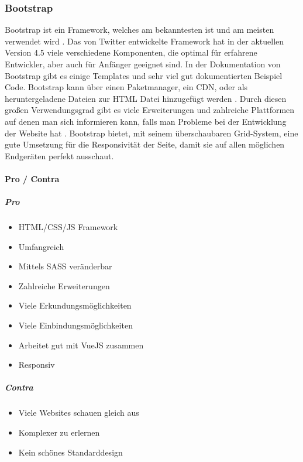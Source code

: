 		\subsubsection{Bootstrap}
		\label{chapter:study-frontend-frameworks-bootstrap}
		Bootstrap ist ein Framework, welches am bekanntesten ist und am meisten verwendet wird \cite{introduction-bootstrap, learning-bootstrap}. Das von Twitter entwickelte Framework hat in der aktuellen Version 4.5 viele verschiedene Komponenten, die optimal für erfahrene Entwickler, aber auch für Anfänger geeignet sind. In der Dokumentation von Bootstrap gibt es einige Templates und sehr viel gut dokumentierten Beispiel Code\cite{introduction-bootstrap}. Bootstrap kann über einen Paketmanager, ein CDN, oder als heruntergeladene Dateien zur HTML Datei hinzugefügt werden \cite{bootstrap-docu}. Durch diesen großen Verwendungsgrad gibt es viele Erweiterungen und zahlreiche Plattformen auf denen man sich informieren kann, falls man Probleme bei der Entwicklung der Website hat \cite{learning-bootstrap}. Bootstrap bietet, mit seinem überschaubaren Grid-System, eine gute Umsetzung für die Responsivität der Seite, damit sie auf allen möglichen Endgeräten perfekt ausschaut.
		\paragraph{Pro / Contra}
		\subparagraph{Pro}
		\begin{itemize}
			\item HTML/CSS/JS Framework
			\item Umfangreich
			\item Mittels SASS veränderbar
			\item Zahlreiche Erweiterungen
			\item Viele Erkundungsmöglichkeiten
			\item Viele Einbindungsmöglichkeiten
			\item Arbeitet gut mit VueJS zusammen
			\item Responsiv
		\end{itemize}
	\label{list:bootstrappro}
		\subparagraph{Contra}
		\begin{itemize}
			\item Viele Websites schauen gleich aus
			\item Komplexer zu erlernen
			\item Kein schönes Standarddesign
		\end{itemize}
	\label{list:bootstrapcontra}
	
